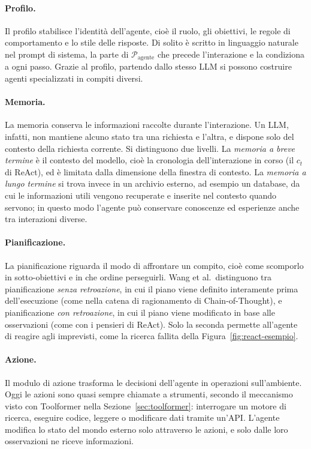 \paragraph{Profilo.} Il profilo stabilisce l'identità dell'agente, cioè il ruolo, gli obiettivi, le regole di comportamento e lo stile delle risposte. Di solito è scritto in linguaggio naturale nel prompt di sistema, la parte di $\mathcal{P}_{\text{agente}}$ che precede l'interazione e la condiziona a ogni passo. Grazie al profilo, partendo dallo stesso LLM si possono costruire agenti specializzati in compiti diversi.

\paragraph{Memoria.} La memoria conserva le informazioni raccolte durante l'interazione. Un LLM, infatti, non mantiene alcuno stato tra una richiesta e l'altra, e dispone solo del contesto della richiesta corrente. Si distinguono due livelli. La \emph{memoria a breve termine} è il contesto del modello, cioè la cronologia dell'interazione in corso (il $c_t$ di ReAct), ed è limitata dalla dimensione della finestra di contesto. La \emph{memoria a lungo termine} si trova invece in un archivio esterno, ad esempio un database, da cui le informazioni utili vengono recuperate e inserite nel contesto quando servono; in questo modo l'agente può conservare conoscenze ed esperienze anche tra interazioni diverse.

\paragraph{Pianificazione.} La pianificazione riguarda il modo di affrontare un compito, cioè come scomporlo in sotto-obiettivi e in che ordine perseguirli. Wang et al.\ distinguono tra pianificazione \emph{senza retroazione}, in cui il piano viene definito interamente prima dell'esecuzione (come nella catena di ragionamento di Chain-of-Thought), e pianificazione \emph{con retroazione}, in cui il piano viene modificato in base alle osservazioni (come con i pensieri di ReAct). Solo la seconda permette all'agente di reagire agli imprevisti, come la ricerca fallita della Figura~\ref{fig:react-esempio}.

\paragraph{Azione.} Il modulo di azione trasforma le decisioni dell'agente in operazioni sull'ambiente. Oggi le azioni sono quasi sempre chiamate a strumenti, secondo il meccanismo visto con Toolformer nella Sezione~\ref{sec:toolformer}: interrogare un motore di ricerca, eseguire codice, leggere o modificare dati tramite un'API. L'agente modifica lo stato del mondo esterno solo attraverso le azioni, e solo dalle loro osservazioni ne riceve informazioni.

